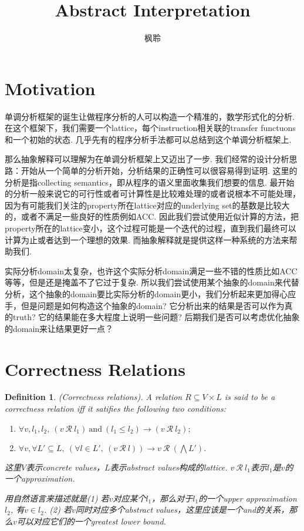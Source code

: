 \documentclass{article}
\newtheorem{definition}[theorem]{Definition}
\begin{document}
\title{Abstract Interpretation}
\author{枫聆}
\maketitle
\tableofcontents

\newpage
\section{Motivation}

单调分析框架的诞生让做程序分析的人可以构造一个精准的，数学形式化的分析. 在这个框架下，我们需要一个lattice，每个instruction相关联的transfer functuons和一个初始的状态. 几乎先有的程序分析手法都可以总结到这个单调分析框架上.

那么抽象解释可以理解为在单调分析框架上又迈出了一步. 我们经常的设计分析思路：开始从一个简单的分析开始，分析结果的正确性可以很容易得到证明. 这里的分析是指collecting semantics，即从程序的语义里面收集我们想要的信息. 最开始的分析一般来说它的可行性或者可计算性是比较难处理的或者说根本不可能处理，因为有可能我们关注的property所在lattice对应的underlying set的基数是比较大的，或者不满足一些良好的性质例如ACC. 因此我们尝试使用近似计算的方法，把property所在的lattice变小，这个过程可能是一个迭代的过程，直到我们最终可以计算为止或者达到一个理想的效果. 而抽象解释就是提供这样一种系统的方法来帮助我们.

实际分析domain太复杂，也许这个实际分析domain满足一些不错的性质比如ACC等等，但是还是掩盖不了它过于复杂. 所以我们尝试使用某个抽象的domain来代替分析，这个抽象的domain要比实际分析的domain更小，我们分析起来更加得心应手，但是问题是如何构造这个抽象的domain? 它分析出来的结果是否可以作为真的truth? 它的结果能在多大程度上说明一些问题? 后期我们是否可以考虑优化抽象的domain来让结果更好一点？

\newpage
\section{Correctness Relations}

\begin{definition}
\rm {\color{red} (Correctness relations).} A relation $R \subseteq V \times L$ is said to be a correctness relation iff it satifies the following two conditions:
\begin{enumerate}
	\item $\forall v,l_1,l_2,~(v~\mathcal{R}~l_1)~\text{and}~(l_1 \leq l_2) \rightarrow (v~\mathcal{R}~l_2);$
	\item $\forall v, \forall L' \subseteq L,~(\forall l \in L',~(v~ \mathcal{R}~l)) \rightarrow v~\mathcal{R}~(\bigwedge L').$
\end{enumerate} 

{\color{red} 这里$V$表示concrete values，$L$表示abstract values构成的lattice. $v~\mathcal{R}~l_1$表示$l_1$是$v$的一个approximation}.

{\color{blue} 用自然语言来描述就是(1) 若$v$对应某个$l_1$，那么对于$l_1$的一个upper approximation $l_2$, 有$v \in l_2$. (2) 若$v$同时对应多个abstract values，这里应该是一个and的关系，那么$v$可以对应它们的一个greatest lower bound}.
\end{definition}
\end{document}
